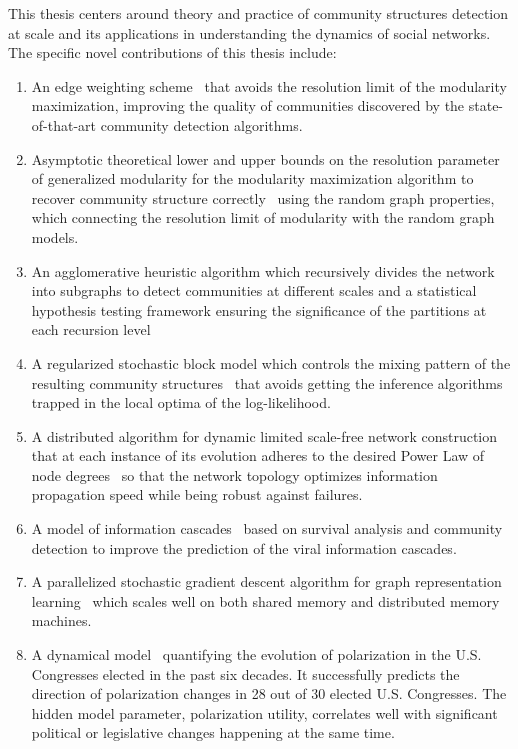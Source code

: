 This thesis centers around theory and practice of community structures detection at scale and its applications in understanding the dynamics of social networks. The specific novel contributions of this thesis include:
%
\begin{enumerate}
  \item An edge weighting scheme~\cite{lu2018adaptive} that avoids the resolution limit of the modularity maximization, improving the quality of communities discovered by the state-of-that-art community detection algorithms.
  
  \item Asymptotic theoretical lower and upper bounds on the resolution parameter of generalized modularity for the modularity maximization algorithm to recover community structure correctly~\cite{lu2019asymptotic} using the random graph properties, which connecting the resolution limit of modularity with the random graph models.
  
  \item An agglomerative heuristic algorithm which recursively divides the network into subgraphs to detect communities at different scales and a statistical hypothesis testing framework ensuring the significance of the partitions at each recursion level~\cite{lu2019asymptotic}
  
  \item A regularized stochastic block model which controls the mixing pattern of the resulting community structures~\cite{lu2019regularized} that avoids getting the inference algorithms trapped in the local optima of the log-likelihood.
  
  \item A distributed algorithm for dynamic limited scale-free network construction that at each instance of its evolution adheres to the desired Power Law of node degrees~\cite{lu2016towards} so that the network topology optimizes information propagation speed while being robust against failures.
  
  \item A model of information cascades~\cite{lu2017predicting} based on survival analysis and community detection to improve the prediction of the viral information cascades.
  
  \item A parallelized stochastic gradient descent algorithm for graph representation learning~\cite{lu2018scalable} which scales well on both shared memory and distributed memory machines.
  
  \item A dynamical model~\cite{lu2018evolution} quantifying the evolution of polarization in the U.S. Congresses elected in the past six decades. It successfully predicts the direction of polarization changes in 28 out of 30 elected U.S. Congresses. The hidden model parameter, polarization utility, correlates well with significant political or legislative changes happening at the same time.
  
\end{enumerate}